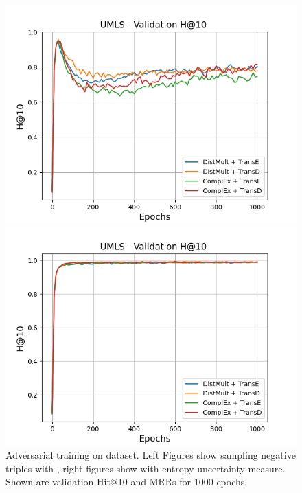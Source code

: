 \begin{figure}[H]
\begin{minipage}{.5\textwidth}
    \end{minipage}
    \begin{minipage}{.5\textwidth}
      \centering
      \includegraphics[width=0.9\linewidth]{figures/results/gan_train/not_pretrained/random/umls/epochs1000/random_umls_hit10.png}
    \end{minipage}%
    \begin{minipage}{.5\textwidth}
      \centering
      \includegraphics[width=0.9\linewidth]{figures/results/gan_train/not_pretrained/uncertainty/max_distribution/entropy/umls/1k_epochs/uncertainty_umls_hit10.png}
    \end{minipage}%
    \caption{Adversarial training on \umls dataset. 
    Left Figures show sampling negative triples with \origsampling, right figures show \ussoftmax with entropy uncertainty measure.
    Shown are validation Hit@10 and MRRs for 1000 epochs.}
    \label{fig:advtrain_umls_random_vs_uncertainty}
\end{figure}
